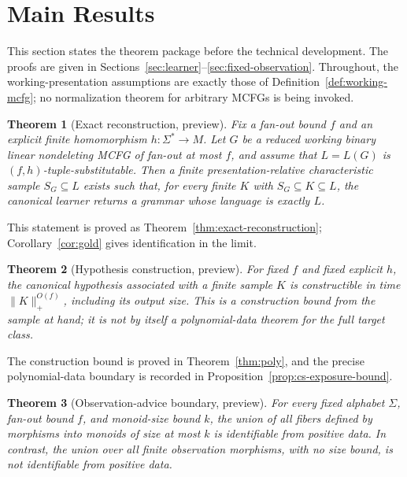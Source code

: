 \documentclass[11pt,a4paper]{article}
\newtheorem{theorem}{Theorem}[section]
\theoremstyle{remark}
\begin{document}
\section{Main Results}
\label{sec:main-results}

This section states the theorem package before the technical development.  The
proofs are given in Sections~\ref{sec:learner}--\ref{sec:fixed-observation}.
Throughout, the working-presentation assumptions are exactly those of
Definition~\ref{def:working-mcfg}; no normalization theorem for arbitrary MCFGs
is being invoked.

\begin{theorem}[Exact reconstruction, preview]
\label{thm:main-exact-preview}
Fix a fan-out bound \(f\) and an explicit finite homomorphism
\(h:\Sigma^*\to M\).  Let \(G\) be a reduced working binary linear
nondeleting MCFG of fan-out at most \(f\), and assume that
\(L=L(G)\) is \((f,h)\)-tuple-substitutable.  Then a finite
presentation-relative characteristic sample \(S_G\subseteq L\) exists such
that, for every finite \(K\) with \(S_G\subseteq K\subseteq L\), the canonical
learner returns a grammar whose language is exactly \(L\).
\end{theorem}

This statement is proved as Theorem~\ref{thm:exact-reconstruction};
Corollary~\ref{cor:gold} gives identification in the limit.

\begin{theorem}[Hypothesis construction, preview]
\label{thm:main-poly-preview}
For fixed \(f\) and fixed explicit \(h\), the canonical hypothesis associated
with a finite sample \(K\) is constructible in time
\(\|K\|_+^{O(f)}\), including its output size.  This is a construction bound
from the sample at hand; it is not by itself a polynomial-data theorem for the
full target class.
\end{theorem}

The construction bound is proved in Theorem~\ref{thm:poly}, and the precise
polynomial-data boundary is recorded in
Proposition~\ref{prop:cs-exposure-bound}.

\begin{theorem}[Observation-advice boundary, preview]
\label{thm:main-advice-preview}
For every fixed alphabet \(\Sigma\), fan-out bound \(f\), and monoid-size bound
\(k\), the union of all fibers defined by morphisms into monoids of size at
most \(k\) is identifiable from positive data.  In contrast, the union over
all finite observation morphisms, with no size bound, is not identifiable from
positive data.
\end{theorem}
\end{document}
